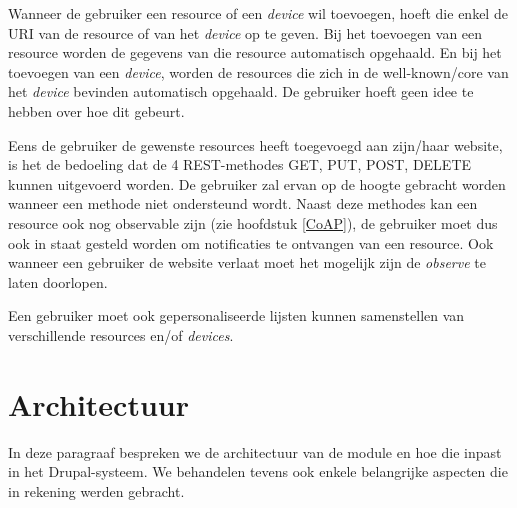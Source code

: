 Wanneer de gebruiker een resource of een \textit{device} wil toevoegen, hoeft die enkel de URI van de resource of van het \textit{device} op te geven. Bij het toevoegen van een resource worden de gegevens van die resource automatisch opgehaald. En bij het toevoegen van een \textit{device}, worden de resources die zich in de well-known/core van het \textit{device} bevinden automatisch opgehaald. De gebruiker hoeft geen idee te hebben over hoe dit gebeurt.

Eens de gebruiker de gewenste resources heeft toegevoegd aan zijn/haar website, is het de bedoeling dat de 4 REST-methodes GET, PUT, POST, DELETE kunnen uitgevoerd worden. De gebruiker zal ervan op de hoogte gebracht worden wanneer een methode niet ondersteund wordt. Naast deze methodes kan een resource ook nog observable zijn (zie hoofdstuk \ref{CoAP}), de gebruiker moet dus ook in staat gesteld worden om notificaties te ontvangen van een resource. Ook wanneer een gebruiker de website verlaat moet het mogelijk zijn de \textit{observe} te laten doorlopen.

Een gebruiker moet ook gepersonaliseerde lijsten kunnen samenstellen van verschillende resources en/of \textit{devices}.

\section{Architectuur}
In deze paragraaf bespreken we de architectuur van de module en hoe die inpast in het Drupal-systeem. We behandelen tevens ook enkele belangrijke aspecten die in rekening werden gebracht. %

